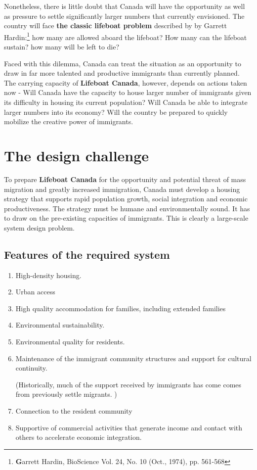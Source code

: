 Nonetheless, there is little doubt that Canada will have the opportunity as well as pressure to settle significantly larger numbers that currently envisioned. 
The country will face \textbf{the classic lifeboat problem}  described by by Garrett Hardin:\footnote{\textbf Garrett Hardin, BioScience Vol. 24, No. 10 (Oct., 1974), pp. 561-568 } how many are allowed aboard the lifeboat?  How many can the lifeboat sustain? how many will be left to die?

Faced with this dilemma, Canada can treat the situation as an opportunity to draw in far more talented and productive immigrants  than currently planned. 
The carrying capacity of \textbf{Lifeboat Canada}, however, depends on actions taken now - Will Canada have the capacity to house larger number of  immigrants given its difficulty in housing its current population?  Will Canada be able to integrate larger numbers into its economy? Will the country be prepared to quickly mobilize  the creative power of immigrants.

\section{The design challenge}
To prepare \textbf{Lifeboat Canada} for the opportunity and 
potential threat of mass migration and greatly increased immigration, Canada must develop a housing strategy that supports rapid population growth, social integration and economic productiveness. The strategy must be humane and environmentally sound. It has to draw on the pre-existing capacities of immigrants. This is clearly a large-scale system design problem.

\subsection{Features of the required system}

\begin{enumerate}
    \item High-density housing.
    \item Urban access
    \item High quality accommodation for families, including extended families  
    \item Environmental sustainability.
    \item Environmental quality for residents.
    \item Maintenance of the immigrant community structures and support for cultural continuity. 
    
    (Historically, much of the support received by immigrants has come comes from previously settle migrants. ) 
    \item Connection to the resident community
    \item Supportive of commercial activities that generate income and contact with others to accelerate economic integration.
    
\end{enumerate}
